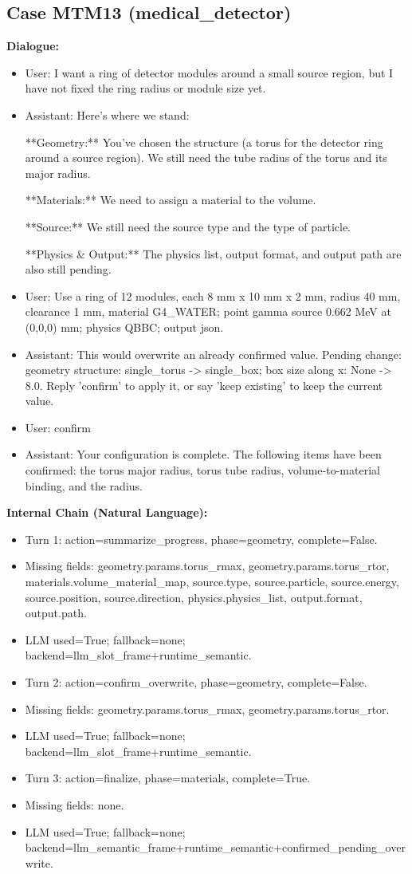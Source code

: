 \documentclass[11pt]{ctexart}
\begin{document}
\subsection{Case MTM13 (medical\_detector)}
\textbf{Dialogue:}
\begin{itemize}
\item User: I want a ring of detector modules around a small source region, but I have not fixed the ring radius or module size yet.
\item Assistant: Here's where we stand:

**Geometry:** You've chosen the structure (a torus for the detector ring around a source region). We still need the tube radius of the torus and its major radius.

**Materials:** We need to assign a material to the volume.

**Source:** We still need the source type and the type of particle.

**Physics \& Output:** The physics list, output format, and output path are also still pending.
\item User: Use a ring of 12 modules, each 8 mm x 10 mm x 2 mm, radius 40 mm, clearance 1 mm, material G4\_WATER; point gamma source 0.662 MeV at (0,0,0) mm; physics QBBC; output json.
\item Assistant: This would overwrite an already confirmed value. Pending change: geometry structure: single\_torus -> single\_box; box size along x: None -> 8.0. Reply 'confirm' to apply it, or say 'keep existing' to keep the current value.
\item User: confirm
\item Assistant: Your configuration is complete. The following items have been confirmed: the torus major radius, torus tube radius, volume-to-material binding, and the radius.
\end{itemize}
\textbf{Internal Chain (Natural Language):}
\begin{itemize}
\item Turn 1: action=summarize\_progress, phase=geometry, complete=False.
\item Missing fields: geometry.params.torus\_rmax, geometry.params.torus\_rtor, materials.volume\_material\_map, source.type, source.particle, source.energy, source.position, source.direction, physics.physics\_list, output.format, output.path.
\item LLM used=True; fallback=none; backend=llm\_slot\_frame+runtime\_semantic.
\item Turn 2: action=confirm\_overwrite, phase=geometry, complete=False.
\item Missing fields: geometry.params.torus\_rmax, geometry.params.torus\_rtor.
\item LLM used=True; fallback=none; backend=llm\_slot\_frame+runtime\_semantic.
\item Turn 3: action=finalize, phase=materials, complete=True.
\item Missing fields: none.
\item LLM used=True; fallback=none; backend=llm\_semantic\_frame+runtime\_semantic+confirmed\_pending\_overwrite.
\end{itemize}
\end{document}
